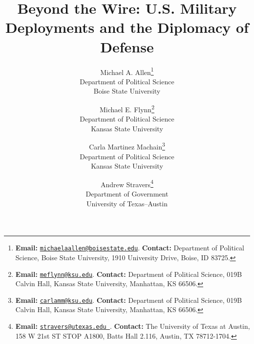 \documentclass[11pt]{book}
\begin{document}
\begin{titlepage}
	\title{Beyond the Wire: U.S. Military Deployments and the Diplomacy of Defense \label{cha:min}}
	\author{Michael A. Allen\thanks{\textbf{Email:} \href{mailto:michaelaallen@boisestate.edu}{\tt michaelaallen@boisestate.edu}. \textbf{Contact:} Department of Political Science, Boise State University, 1910 University Drive, Boise, ID 83725.}\\
		Department of Political Science\\
		Boise State University \\
		\and Michael E. Flynn\thanks{\textbf{Email:} \href{mailto:meflynn@ksu.edu}{\tt meflynn@ksu.edu}. \textbf{Contact:} Department of Political Science, 019B Calvin Hall, Kansas State University, Manhattan, KS 66506.} \\
		Department of Political Science \\
		Kansas State University \\
		\and
		Carla Martinez Machain\thanks{\textbf{Email:} \href{mailto:carlamm@ksu.edu}{\tt carlamm@ksu.edu}. \textbf{Contact:} Department of Political Science, 019B Calvin Hall, Kansas State University, Manhattan, KS 66506.}\\
		Department of Political Science\\
		Kansas State University \\
		\and
		Andrew Stravers\thanks{\textbf{Email:} \href{mailto:stravers@utexas.edu }{\tt stravers@utexas.edu }. \textbf{Contact:} The University of Texas at Austin, 158 W 21st ST STOP A1800, Batts Hall 2.116, Austin, TX 78712-1704.}\\
		Department of Government\\
		University of Texas--Austin
	}
	
	\maketitle

	\thispagestyle{empty}
\end{titlepage}



\frontmatter

\pagestyle{empty}


%


%


\tableofcontents



\listoftables
{}
\end{document}
